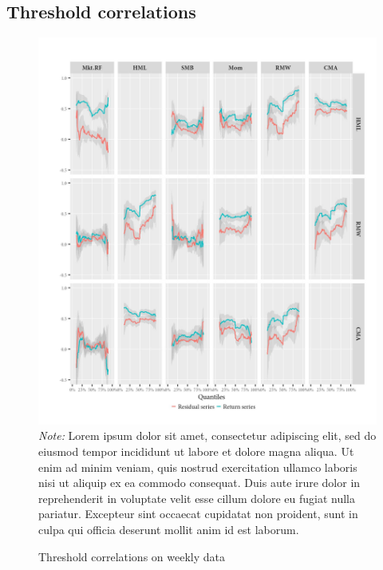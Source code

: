 \subsection{Threshold correlations}
\begin{figure}[H]
  \caption{Threshold correlations on weekly data}
  \label{diag:thresholdweekly}
  \centering
  \begin{minipage}{\textwidth}
  \includegraphics[scale=1]{graphics/thresholdweekly.jpeg}  
  \footnotesize
  \textit{Note:} Lorem ipsum dolor sit amet, consectetur adipiscing elit, sed do eiusmod tempor incididunt ut labore et dolore magna aliqua. Ut enim ad minim veniam, quis nostrud exercitation ullamco laboris nisi ut aliquip ex ea commodo consequat. Duis aute irure dolor in reprehenderit in voluptate velit esse cillum dolore eu fugiat nulla pariatur. Excepteur sint occaecat cupidatat non proident, sunt in culpa qui officia deserunt mollit anim id est laborum.
  \end{minipage}
\end{figure}

